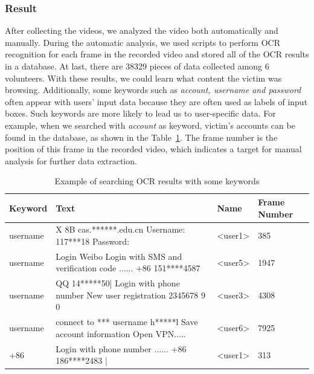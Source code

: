 \subsubsection{Result}
After collecting the videos, we analyzed the video both automatically and manually.
During the automatic analysis, we used scripts to perform OCR recognition for each frame in the recorded video and stored all of the OCR results in a database.
At last, there are 38329 pieces of data collected among 6 volunteers.
With these results, we could learn what content the victim was browsing.
Additionally, some keywords such as \textit{account, username and password} often appear with users' input data because they are often used as labels of input boxes.
Such keywords are more likely to lead us to user-specific data.
For example, when we searched with \textit{account} as keyword, victim's accounts can be found in the database, as shown in the Table~\ref{tab:ocr_keyword_example}.
The frame number is the position of this frame in the recorded video, which indicates a target for manual analysis for further data extraction.

\begin{table}[t]
	\centering
	\begin{tabular}{|l|l|l|l|}
		\hline
		Keyword  & Text                                                                                                                          & Name                           & Frame Number \\ \hline
		username & X 8B cas.******.edu.cn Username: 117***18 Password:                                                                           & \textless{}user1\textgreater{} & 385          \\ \hline
		username & Login Weibo Login with SMS and verification code ...... +86 151****4587 & \textless{}user5\textgreater{} & 1947         \\ \hline
		username & QQ 14*****50| Login with phone number New user registration 2345678 9 0                                                       & \textless{}user3\textgreater{} & 4308         \\ \hline
		username & connect to *** username h*****l Save account information Open VPN.....                                                        & \textless{}user6\textgreater{} & 7925         \\ \hline
		+86      & Login with phone number ...... +86 186****2483 |                                                                              & \textless{}user1\textgreater{} & 313          \\ \hline
	\end{tabular}
	\caption{Example of searching OCR results with some keywords}
	\label{tab:ocr_keyword_example}
\end{table}


